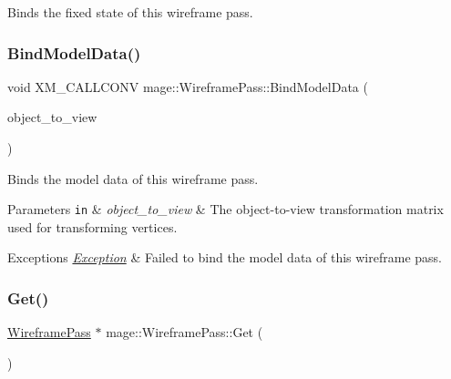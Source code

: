 Binds the fixed state of this wireframe pass. \hypertarget{classmage_1_1_wireframe_pass_a6e316eaabf3afb71162490c1f3c244f3}{}\label{classmage_1_1_wireframe_pass_a6e316eaabf3afb71162490c1f3c244f3} 
\subsubsection{\texorpdfstring{Bind\+Model\+Data()}{BindModelData()}}
{\footnotesize\ttfamily void X\+M\+\_\+\+C\+A\+L\+L\+C\+O\+NV mage\+::\+Wireframe\+Pass\+::\+Bind\+Model\+Data (\begin{DoxyParamCaption}\item[{F\+X\+M\+M\+A\+T\+R\+IX}]{object\+\_\+to\+\_\+view }\end{DoxyParamCaption})\hspace{0.3cm}{\ttfamily [private]}}

Binds the model data of this wireframe pass.


\begin{DoxyParams}[1]{Parameters}
\mbox{\tt in}  & {\em object\+\_\+to\+\_\+view} & The object-\/to-\/view transformation matrix used for transforming vertices. \\
\hline
\end{DoxyParams}

\begin{DoxyExceptions}{Exceptions}
{\em \hyperlink{classmage_1_1_exception}{Exception}} & Failed to bind the model data of this wireframe pass. \\
\hline
\end{DoxyExceptions}
\hypertarget{classmage_1_1_wireframe_pass_ace5168eac9d32c1bfa71df3411960f48}{}\label{classmage_1_1_wireframe_pass_ace5168eac9d32c1bfa71df3411960f48} 
\subsubsection{\texorpdfstring{Get()}{Get()}}
{\footnotesize\ttfamily \hyperlink{classmage_1_1_wireframe_pass}{Wireframe\+Pass} $\ast$ mage\+::\+Wireframe\+Pass\+::\+Get (\begin{DoxyParamCaption}{ }\end{DoxyParamCaption})\hspace{0.3cm}{\ttfamily [static]}}

